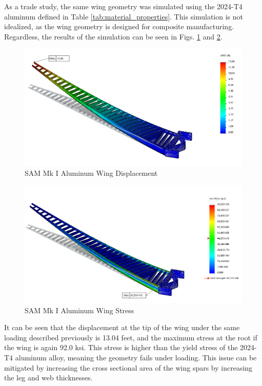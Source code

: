 As a trade study, the same wing geometry was simulated using the 2024-T4 aluminum defined in Table \ref{tab:material_properties}. This simulation is not idealized, as the wing geometry is designed for composite manufacturing. Regardless, the results of the simulation can be seen in Figs. \ref{fig:wing_displacement_al} and \ref{fig:wing_stress_al}.

\begin{figure}[!h]
    \centering
    \includegraphics[width=\linewidth]{Photos/structuresandloads/Wing Displacement Aluminum.PNG}
    \caption{SAM Mk I Aluminum Wing Displacement}
    \label{fig:wing_displacement_al}
\end{figure}
\begin{figure}[!h]
    \centering
    \includegraphics[width=\linewidth]{Photos/structuresandloads/Wing Stress Aluminum.PNG}
    \caption{SAM Mk I Aluminum Wing Stress}
    \label{fig:wing_stress_al}
\end{figure}
\FloatBarrier


\clearpage
It can be seen that the displacement at the tip of the wing under the same loading described previously is 13.04 feet, and the maximum stress at the root if the wing is again 92.0 ksi. This stress is higher than the yield stress of the 2024-T4 aluminum alloy, meaning the geometry fails under loading. This issue can be mitigated by increasing the cross sectional area of the wing spars by increasing the leg and web thicknesses. 

